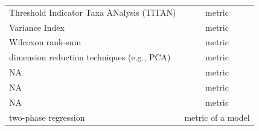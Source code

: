 \documentclass[12pt,twoside,openany]{reedthesis}
\begin{document}
\begin{longtable}[]{@{}lc@{}}
\begin{minipage}[t]{0.43\columnwidth}
Threshold Indicator Taxa
ANalysis (TITAN)\strut
\end{minipage} & \begin{minipage}[t]{0.35\columnwidth}\centering
metric\strut
\end{minipage}\tabularnewline
\begin{minipage}[t]{0.43\columnwidth}\raggedright
Variance Index\strut
\end{minipage} & \begin{minipage}[t]{0.35\columnwidth}\centering
metric\strut
\end{minipage}\tabularnewline
\begin{minipage}[t]{0.43\columnwidth}\raggedright
Wilcoxon rank-sum\strut
\end{minipage} & \begin{minipage}[t]{0.35\columnwidth}\centering
metric\strut
\end{minipage}\tabularnewline
\begin{minipage}[t]{0.43\columnwidth}\raggedright
dimension reduction techniques
(e.g., PCA)\strut
\end{minipage} & \begin{minipage}[t]{0.35\columnwidth}\centering
metric\strut
\end{minipage}\tabularnewline
\begin{minipage}[t]{0.43\columnwidth}\raggedright
NA\strut
\end{minipage} & \begin{minipage}[t]{0.35\columnwidth}\centering
metric\strut
\end{minipage}\tabularnewline
\begin{minipage}[t]{0.43\columnwidth}\raggedright
NA\strut
\end{minipage} & \begin{minipage}[t]{0.35\columnwidth}\centering
metric\strut
\end{minipage}\tabularnewline
\begin{minipage}[t]{0.43\columnwidth}\raggedright
NA\strut
\end{minipage} & \begin{minipage}[t]{0.35\columnwidth}\centering
metric\strut
\end{minipage}\tabularnewline
\begin{minipage}[t]{0.43\columnwidth}\raggedright
two-phase regression\strut
\end{minipage} & \begin{minipage}[t]{0.35\columnwidth}\centering
metric of a model\strut
\end{minipage}\tabularnewline

\end{longtable}
\end{document}
